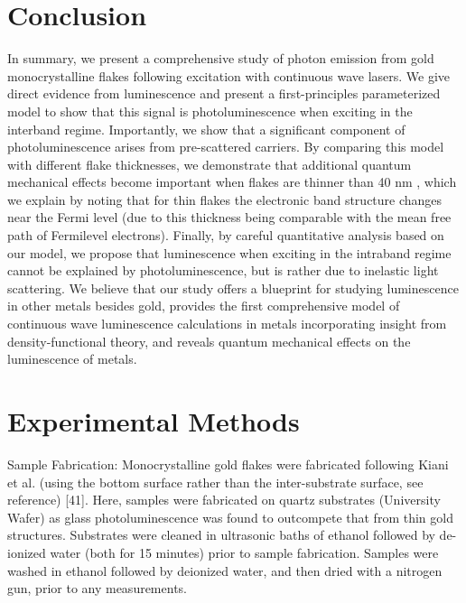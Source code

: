 \documentclass[10pt]{article}
\begin{document}
\section*{Conclusion}
In summary, we present a comprehensive study of photon emission from gold monocrystalline flakes following excitation with continuous wave lasers. We give direct evidence from luminescence and present a first-principles parameterized model to show that this signal is photoluminescence when exciting in the interband regime. Importantly, we show that a significant component of photoluminescence arises from pre-scattered carriers. By comparing this model with different flake thicknesses, we demonstrate that additional quantum mechanical effects become important when flakes are thinner than 40 nm , which we explain by noting that for thin flakes the electronic band structure changes near the Fermi level (due to this thickness being comparable with the mean free path of Fermilevel electrons). Finally, by careful quantitative analysis based on our model, we propose that luminescence when exciting in the intraband regime cannot be explained by photoluminescence, but is rather due to inelastic light scattering. We believe that our study offers a blueprint for studying luminescence in other metals besides gold, provides the first comprehensive model of continuous wave luminescence calculations in metals incorporating insight from density-functional theory, and reveals quantum mechanical effects on the luminescence of metals.

\section*{Experimental Methods}
Sample Fabrication: Monocrystalline gold flakes were fabricated following Kiani et al. (using the bottom surface rather than the inter-substrate surface, see reference) [41]. Here, samples were fabricated on quartz substrates (University Wafer) as glass photoluminescence was found to outcompete that from thin gold structures. Substrates were cleaned in ultrasonic baths of ethanol followed by de-ionized water (both for 15 minutes) prior to sample fabrication. Samples were washed in ethanol followed by deionized water, and then dried with a nitrogen gun, prior to any measurements.
\end{document}

